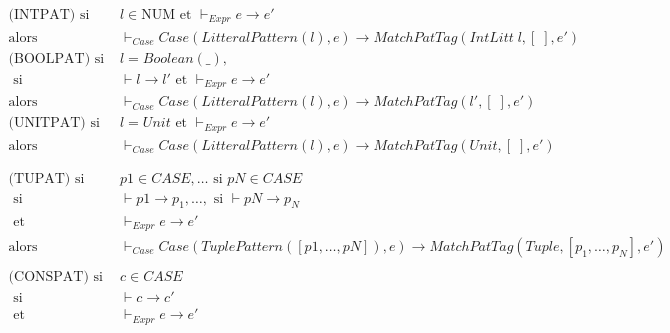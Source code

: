 \documentclass[
  12pt,
]{article}
\begin{document}
\begin{align*}
  \text{(INTPAT)} \text{ si }  & l \in \text{NUM} \text{ et }  \vdash_{Expr} e \rightarrow  e'                      \\
  \text{alors}                 & \vdash_{Case} Case(LitteralPattern(l), e) \rightarrow
  MatchPatTag(IntLitt\; l, [\;], e')                                                                                \\
  \text{(BOOLPAT)} \text{ si } & l = Boolean(\_),                                                                   \\
  \text{ si }                  & \vdash l \rightarrow  l' \text{ et }  \vdash_{Expr} e \rightarrow  e'              \\
  \text{alors}                 & \vdash_{Case} Case(LitteralPattern(l), e)
  \rightarrow  MatchPatTag(l', [\;], e')                                                                            \\
  \text{(UNITPAT)} \text{ si } & l = Unit \text{ et }  \vdash_{Expr} e \rightarrow  e'                              \\
  \text{alors}                 & \vdash_{Case} Case(LitteralPattern(l), e) \rightarrow  MatchPatTag(Unit, [\;], e') \\
  \\
  \\
  \text{(TUPAT)}
  \text{ si }                  & p1  \in CASE,\dots \text{ si } pN  \in CASE                                        \\
  \text{ si }                  & \vdash p1 \rightarrow  p_1, \dots, \text{ si }  \vdash pN \rightarrow  p_N         \\
  \text{ et }                  & \vdash_{Expr} e \rightarrow  e'                                                    \\
  \text{alors}                 & \vdash_{Case} Case(TuplePattern([p1,\dots,pN]), e)
  \rightarrow  MatchPatTag(Tuple, [p_1,\dots,p_N], e')                                                              \\
  \\
  \text{(CONSPAT)}
  \text{ si }                  & c  \in CASE                                                                        \\
  \text{ si }                  & \vdash c \rightarrow  c'                                                           \\
  \text{ et }                  & \vdash_{Expr} e \rightarrow  e'                                                    \\

\end{align*}
\end{document}
